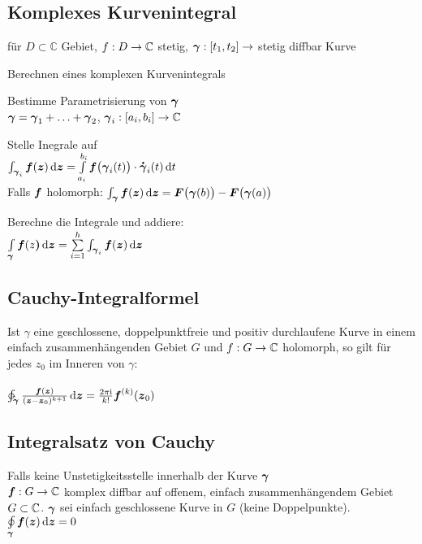 \documentclass[german,color,5pt]{latex4ei/latex4ei_fs}
\begin{document}
\begin{sectionbox}
	\subsection{Komplexes Kurvenintegral}
	für $D \subset \mathbb C$ Gebiet, $f: D \rightarrow \mathbb C$ stetig, $\boldsymbol{\gamma}: [t_1, t_2] \rightarrow $ stetig diffbar Kurve
	\begin{cookbox}{Berechnen eines komplexen Kurvenintegrals}
		\item Bestimme Parametrisierung von $\boldsymbol{\gamma}$ \\
		$\boldsymbol{\gamma} = \boldsymbol{\gamma}_1 + \ldots + \boldsymbol{\gamma}_2$, $\boldsymbol{\gamma}_i : [a_i, b_i] \rightarrow \mathbb C$
		\item Stelle Inegrale auf \\
		$\int_{\cx \gamma_i} \cx f(\cx z) \diff \cx z = \int \limits_{a_i}^{b_i} \cx f\big(\cx \gamma_i(t)\big) \cdot \dot{\cx \gamma}_i (t) \diff t$\\
		Falls $\boldsymbol{f}$ holomorph: $\int_{\cx \gamma} \cx f(\cx z) \diff \cx z = \cx F\big(\cx \gamma(b)\big) - \cx F\big(\cx \gamma(a)\big)$
		\item Berechne die Integrale und addiere: \\
		$\int \limits_{\cx \gamma} \cx f(z\cx ) \diff \cx z = \sum \limits_{i = 1}^{h} \int_{\cx \gamma_i} \cx f(\cx z) \diff \cx z$
	\end{cookbox}
\end{sectionbox}

\begin{sectionbox}
	\subsection{Cauchy-Integralformel}
	Ist $\gamma$ eine geschlossene, doppelpunktfreie und positiv durchlaufene Kurve in einem einfach zusammenhängenden Gebiet $G$ und $f : G \rightarrow \mathbb{C}$ holomorph, so gilt für jedes $z_0$ im Inneren von $\gamma$: \\
	\\
	$\ointctrclockwise_{\cx \gamma} \frac{\cx f(\cx z)}{(\cx z - \cx z_0)^{k+1}} \diff \cx z = \frac{2\pi \i}{k!} \cx f^{(k)}(\cx z_0) $ 
\end{sectionbox}

\begin{sectionbox}
	\subsection{Integralsatz von Cauchy}
	Falls keine Unstetigkeitsstelle innerhalb der Kurve $\boldsymbol{\gamma}$\\ 
	$\boldsymbol{f}: G \rightarrow \mathbb C$ komplex diffbar auf offenem, einfach zusammenhängendem Gebiet $G \subset \mathbb C$. $\boldsymbol{\gamma}$ sei einfach geschlossene Kurve in $G$ (keine Doppelpunkte). \\
	$\oint \limits_{\cx \gamma} \cx f(\cx z) \diff \cx z = 0$
\end{sectionbox}
\end{document}
